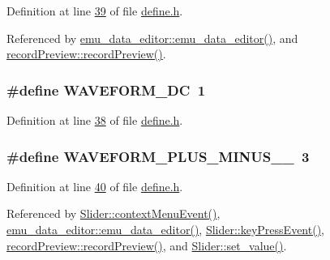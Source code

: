 Definition at line \hyperlink{a00090_source_l00039}{39} of file \hyperlink{a00090_source}{define.\+h}.



Referenced by \hyperlink{a00093_source_l00012}{emu\+\_\+data\+\_\+editor\+::emu\+\_\+data\+\_\+editor()}, and \hyperlink{a00129_source_l00011}{record\+Preview\+::record\+Preview()}.

\hypertarget{a00090_a0997727a7675c2520283e5c2b2018d7d}{
\subsubsection[{W\+A\+V\+E\+F\+O\+R\+M\+\_\+\+D\+C}]{\setlength{\rightskip}{0pt plus 5cm}\#define W\+A\+V\+E\+F\+O\+R\+M\+\_\+\+D\+C~1}}\label{a00090_a0997727a7675c2520283e5c2b2018d7d}


Definition at line \hyperlink{a00090_source_l00038}{38} of file \hyperlink{a00090_source}{define.\+h}.

\hypertarget{a00090_a0923d3b365a36e1e8c401cec964aa36f}{
\subsubsection[{W\+A\+V\+E\+F\+O\+R\+M\+\_\+\+P\+L\+U\+S\+\_\+\+M\+I\+N\+U\+S\+\_\+1\+\_\+65}]{\setlength{\rightskip}{0pt plus 5cm}\#define W\+A\+V\+E\+F\+O\+R\+M\+\_\+\+P\+L\+U\+S\+\_\+\+M\+I\+N\+U\+S\+\_\+\_~3}}\label{a00090_a0923d3b365a36e1e8c401cec964aa36f}


Definition at line \hyperlink{a00090_source_l00040}{40} of file \hyperlink{a00090_source}{define.\+h}.



Referenced by \hyperlink{a00133_source_l00309}{Slider\+::context\+Menu\+Event()}, \hyperlink{a00093_source_l00012}{emu\+\_\+data\+\_\+editor\+::emu\+\_\+data\+\_\+editor()}, \hyperlink{a00133_source_l00219}{Slider\+::key\+Press\+Event()}, \hyperlink{a00129_source_l00011}{record\+Preview\+::record\+Preview()}, and \hyperlink{a00133_source_l00102}{Slider\+::set\+\_\+value()}.

